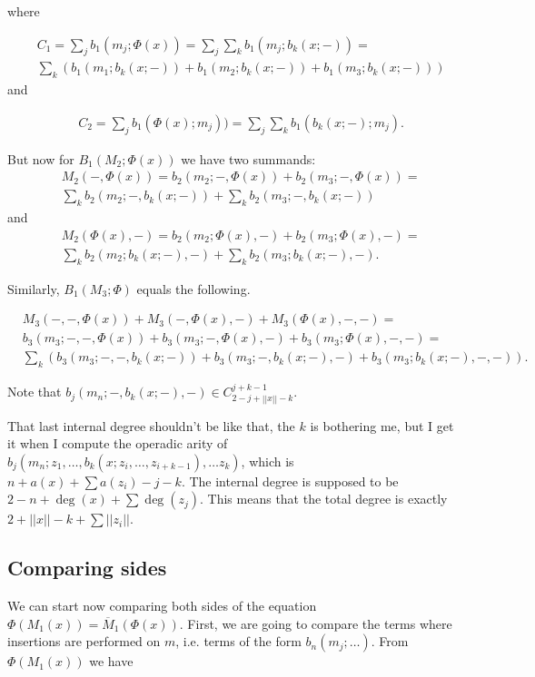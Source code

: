 \documentclass[twoside]{article}
\begin{document}
where

\begin{align*}
&C_1=\sum_j b_1(m_j;\Phi(x))=\sum_j\sum_k b_1(m_j;b_k(x;-))=\\
&\sum_k(b_1(m_1;b_k(x;-))+b_1(m_2;b_k(x;-))+b_1(m_3;b_k(x;-)))
\end{align*}
and

\begin{align*}
&C_2=\sum_j b_1(\Phi(x);m_j))=\sum_j\sum_k b_1(b_k(x;-);m_j).
\end{align*}


But now for $B_1(M_2;\Phi(x))$ we have two summands:
\begin{align*}
&M_2(-,\Phi(x))=b_2(m_2;-,\Phi(x))+b_2(m_3;-,\Phi(x))=\\
&\sum_k b_2(m_2; -,b_k(x;-))+\sum_k b_2(m_3;-,b_k(x;-))
\end{align*}
and
\begin{align*}
&M_2(\Phi(x),-)=b_2(m_2;\Phi(x),-)+b_2(m_3;\Phi(x),-)=\\
&\sum_k b_2(m_2;b_k(x;-),-)+\sum_k b_2(m_3;b_k(x;-),-).
\end{align*}

Similarly, $B_1(M_3;\Phi)$ equals the following.

\begin{align*}
&M_3(-,-,\Phi(x))+M_3(-,\Phi(x),-)+M_3(\Phi(x),-,-)=\\
&b_3(m_3;-,-,\Phi(x))+b_3(m_3;-,\Phi(x),-)+b_3(m_3;\Phi(x),-,-)=\\
&\sum_k (b_3(m_3; -,-,b_k(x;-))+ b_3(m_3;-,b_k(x;-),-)+b_3(m_3;b_k(x;-),-,-)).
\end{align*}

Note that $b_j(m_n;-,b_k(x;-),-)\in C^{j+k-1}_{2-j+||x||-k}$.

\begin{remark}
That last internal degree shouldn't be like that, the $k$ is bothering me, but I get it when I compute the operadic arity of $b_j(m_n;z_1,\dots,b_k(x;z_i,\dots, z_{i+k-1}),\dots z_k)$, which is $n+a(x)+\sum a(z_i)-j-k$. The internal degree is supposed to be $2-n+\deg(x)+\sum \deg(z_j)$. This means that the total degree is exactly $2+||x||-k+\sum ||z_i||$.
\end{remark} 
\subsection{Comparing sides}

We can start now comparing both sides of the equation $\Phi(M_1(x))=\overline{M}_1(\Phi(x))$. First, we are going to compare the terms where insertions are performed on $m$, i.e. terms of the form $b_n(m_j;\dots)$. From $\Phi(M_1(x))$ we have
\end{document}
